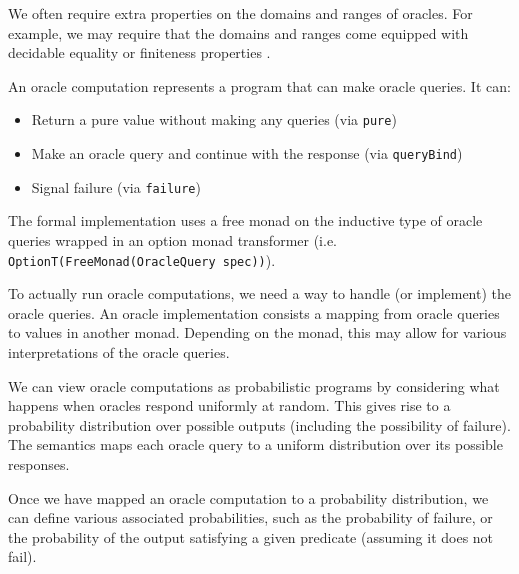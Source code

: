 We often require extra properties on the domains and ranges of oracles. For example, we may require that the domains and ranges come equipped with decidable equality 
or finiteness properties .

\begin{definition}
    \label{def:oracle_computation}
    An oracle computation represents a program that can make oracle queries. It can:
    \begin{itemize}
        \item Return a pure value without making any queries (via \texttt{pure})
        \item Make an oracle query and continue with the response (via \texttt{queryBind})
        \item Signal failure (via \texttt{failure})
    \end{itemize}
    The formal implementation uses a free monad on the inductive type of oracle queries  wrapped in an option monad transformer (i.e. \verb|OptionT(FreeMonad(OracleQuery spec))|).
\end{definition}

\begin{definition}
    \label{def:handling_oracle_queries}
    To actually run oracle computations, we need a way to handle (or implement) the oracle queries.
    An oracle implementation consists a mapping from oracle queries to values in another monad. Depending on the monad, this may allow for various interpretations of the oracle queries.
\end{definition}

\begin{definition}
    \label{def:probabilistic_semantics_of_oracle_computations}
    We can view oracle computations as probabilistic programs by considering what happens when 
    oracles respond uniformly at random. This gives rise to a probability distribution over possible 
    outputs (including the possibility of failure). The semantics maps each oracle query to a 
    uniform distribution over its possible responses.
\end{definition}

Once we have mapped an oracle computation to a probability distribution, we can define various associated probabilities, such as the probability of failure, or the probability of the output satisfying a given predicate (assuming it does not fail).

